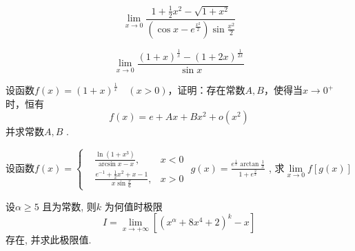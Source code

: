 \begin{question}
    \begin{equation}
        \nonumber
        \lim\limits_{x \to 0} \frac{ 1 + \frac{1}{2} x^2 - \sqrt{ 1 + x^2 } }{ ( \cos x - e^{ \frac{x^2}{2} }) \sin \frac{x^2}{2} }
    \end{equation}
\end{question}

\begin{question}
    \begin{equation*}
        \lim\limits_{x \to 0} \frac{ ( 1 + x )^{ \frac{1}{x} } -( 1 + 2x )^{ \frac{1}{2x} } }{ \sin x }
    \end{equation*}
\end{question}

\begin{question}
    设函数$ f(x) = (1 + x)^{\frac{1}{x}} \quad (x > 0) $，证明：存在常数$ A, B $，使得当$ x \to 0^+ $时，恒有
    \begin{equation*}
        f(x) = e + Ax +Bx^2 + o(x^2)
    \end{equation*}   
    并求常数$ A, B $ .
\end{question}

\begin{question}
    设函数$ f(x) = \left\{
        \begin{aligned}
            &\frac{ \ln(1 + x^3) }{ \arcsin x - x }, & x < 0   \\
            &\frac{ e^{-1} + \frac{1}{2} x^2 + x -1 }{ x \sin \frac{x}{6} }, & x > 0
        \end{aligned}  
    \right. $ 
    $ g(x) = \frac{ e^{\frac{1}{x}} \arctan \frac{1}{x} }{ 1 + e^{\frac{2}{x}} } $ , 求$ \lim\limits_{x \to 0} f [ g( x ) ] $ 
\end{question}

\begin{question}
    设$ \alpha \ge 5 $ 且为常数, 则$ k $ 为何值时极限
    \begin{equation*}
        I = \lim\limits_{x \to + \infty} [( x^\alpha + 8x^4 +2 )^k - x]
    \end{equation*}
    存在, 并求此极限值.
\end{question}